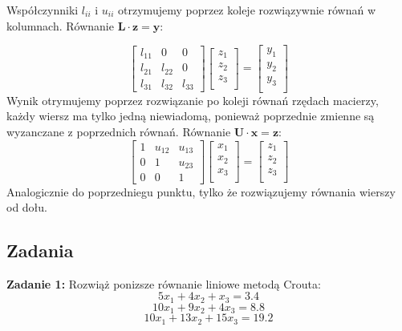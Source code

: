 \documentclass[a4paper]{article}
\begin{document}
Współczynniki $l_{ii}$ i $u_{ii}$ otrzymujemy poprzez koleje rozwiązywnie równań w kolumnach. 
\newline
Równanie $\mathbf{L} \cdot \mathbf{z} = \mathbf{y}:$

$$\begin{bmatrix}
l_{11}      & 0      & 0 \\
l_{21} & l_{22}      & 0 \\
l_{31} & l_{32} & l_{33}
\end{bmatrix} 
\begin{bmatrix}
z_{1} \\
z_{2} \\
z_{3}\\
\end{bmatrix} = 
\begin{bmatrix}
y_{1} \\
y_{2} \\
y_{3}\\
\end{bmatrix}$$
Wynik otrymujemy poprzez rozwiązanie po koleji równań rzędach macierzy, każdy wiersz ma tylko jedną niewiadomą, ponieważ poprzednie zmienne są wyzanczane z poprzednich równań.
\newline
Równanie $\mathbf{U} \cdot \mathbf{x} = \mathbf{z}:$
$$\begin{bmatrix}
1 & u_{12} & u_{13} \\
0      & 1 &  u_{23} \\
0      & 0      &  1
\end{bmatrix}
\begin{bmatrix}
x_{1} \\
x_{2} \\
x_{3}\\
\end{bmatrix} = 
\begin{bmatrix}
z_{1} \\
z_{2} \\
z_{3}\\
\end{bmatrix}$$
Analogicznie do poprzedniegu punktu, tylko że rozwiązujemy równania wierszy od dołu.

\subsection{Zadania}

\textbf{Zadanie 1:}
\newline
Rozwiąż ponizsze równanie liniowe metodą Crouta:
$$5x_{1}+4x_{2}+x_{3} = 3.4 $$
$$10x_{1}+9x_{2}+4x_{3} = 8.8 $$
$$10x_{1}+13x_{2}+15x_{3} = 19.2  $$
\end{document}
